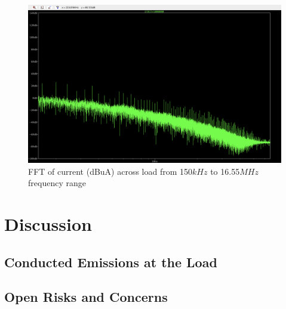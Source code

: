 \documentclass[conference]{IEEEtran}
\begin{document}
\begin{figure}[htp]
    \centering
    \includegraphics[width=1.0\linewidth]{load_fft_150kHz_16MHz.png}
    \caption{FFT of current (dBuA) across load from 150$kHz$ to 16.55$MHz$ frequency range}
    \label{fig:load_fft_150kHz_16MHz_waveform}
\end{figure}

\section{Discussion}
\subsection{Conducted Emissions at the Load}
\subsection{Open Risks and Concerns}

\nocite{*}


\end{document}
